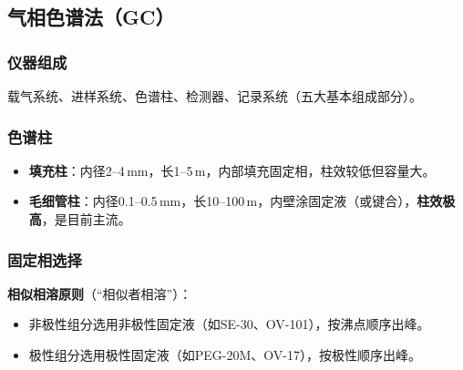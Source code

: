 \documentclass[11pt,a4paper]{article}
\begin{document}
\subsection{气相色谱法（GC）}

\subsubsection{仪器组成}
载气系统、进样系统、色谱柱、检测器、记录系统（五大基本组成部分）。

\subsubsection{色谱柱}
\begin{itemize}
    \item \textbf{填充柱}：内径2--4\,mm，长1--5\,m，内部填充固定相，柱效较低但容量大。
    \item \textbf{毛细管柱}：内径0.1--0.5\,mm，长10--100\,m，内壁涂固定液（或键合），\textbf{柱效极高}，是目前主流。
\end{itemize}

\subsubsection{固定相选择}
\textbf{相似相溶原则}（“相似者相溶”）：
\begin{itemize}
    \item 非极性组分选用非极性固定液（如SE-30、OV-101），按沸点顺序出峰。
    \item 极性组分选用极性固定液（如PEG-20M、OV-17），按极性顺序出峰。
\end{itemize}
\end{document}
